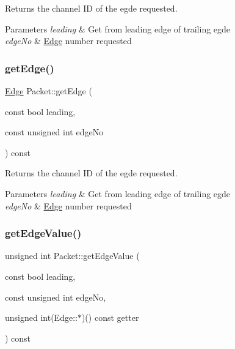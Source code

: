 Returns the channel ID of the egde requested. 


\begin{DoxyParams}{Parameters}
{\em leading} & Get from leading edge of trailing egde \\
\hline
{\em edge\+No} & \hyperlink{class_edge}{Edge} number requested \\
\hline
\end{DoxyParams}
\mbox{\label{class_packet_a457fdd6c0e5cdb161a77550203504e6d}} 
\subsubsection{\texorpdfstring{get\+Edge()}{getEdge()}}
{\footnotesize\ttfamily \hyperlink{class_edge}{Edge} Packet\+::get\+Edge (\begin{DoxyParamCaption}\item[{const bool}]{leading,  }\item[{const unsigned int}]{edge\+No }\end{DoxyParamCaption}) const}



Returns the channel ID of the egde requested. 


\begin{DoxyParams}{Parameters}
{\em leading} & Get from leading edge of trailing egde \\
\hline
{\em edge\+No} & \hyperlink{class_edge}{Edge} number requested \\
\hline
\end{DoxyParams}
\mbox{\label{class_packet_af3abe7485b62e417e83b11c8891ba7a6}} 
\subsubsection{\texorpdfstring{get\+Edge\+Value()}{getEdgeValue()}}
{\footnotesize\ttfamily unsigned int Packet\+::get\+Edge\+Value (\begin{DoxyParamCaption}\item[{const bool}]{leading,  }\item[{const unsigned int}]{edge\+No,  }\item[{unsigned int(Edge\+::$\ast$)() const}]{getter }\end{DoxyParamCaption}) const\hspace{0.3cm}{\ttfamily [private]}}



